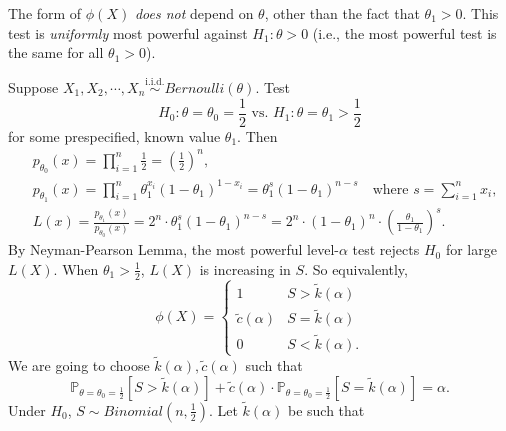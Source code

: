 \documentclass[a4paper]{article}
\begin{document}
\begin{remark}
	The form of $\phi(X)$ \emph{does not} depend on $\theta$, other than the fact that $\theta_1 > 0$. This test is \emph{uniformly} most powerful against $H_1: \theta > 0$ (i.e., the most powerful test is the same for all $\theta_1 > 0$).
\end{remark}

\begin{eg}
	Suppose $X_1,X_2,\cdots,X_n \stackrel{\text{i.i.d.}}{\sim} Bernoulli(\theta)$. Test
	\begin{equation*}
		H_0: \theta = \theta_0 = \frac{1}{2} \text{ vs. } H_1: \theta = \theta_1 > \frac{1}{2}
	\end{equation*}
	for some prespecified, known value $\theta_1$. Then
	\begin{equation*}
		\begin{aligned}
			& p_{\theta_0}(x) = \prod\limits_{i=1}^n \frac{1}{2} = (\frac{1}{2})^n, \\
			& p_{\theta_1}(x) = \prod\limits_{i=1}^n \theta_1^{x_i}(1-\theta_1)^{1-x_i} = \theta_1^s(1-\theta_1)^{n-s} \quad \text{where } s =\sum\limits_{i=1}^n x_i, \\
			& L(x) = \frac{p_{\theta_1}(x)}{p_{\theta_0}(x)} = 2^n \cdot \theta_1^s (1-\theta_1)^{n-s} = 2^n \cdot (1-\theta_1)^n \cdot \left(\frac{\theta_1}{1-\theta_1}\right)^s.
		\end{aligned}
	\end{equation*}
	By Neyman-Pearson Lemma, the most powerful level-$\alpha$ test rejects $H_0$ for large $L(X)$.
	When $\theta_1 > \frac{1}{2}$, $L(X)$ is increasing in $S$. So equivalently,
	\begin{equation*}
		\phi(X) = \left\{
		\begin{array}{ll}
			1 & S > \tilde{k}(\alpha) \\
			\tilde{c}(\alpha) & S = \tilde{k}(\alpha) \\
			0 & S < \tilde{k}(\alpha).
		\end{array}
		\right.	
	\end{equation*}
	We are going to choose $\tilde{k}(\alpha), \tilde{c}(\alpha)$ such that
	\begin{equation*}
		\mathbb{P}_{\theta = \theta_0 = \frac{1}{2}}[S > \tilde{k}(\alpha)] + \tilde{c}(\alpha) \cdot \mathbb{P}_{\theta = \theta_0 = \frac{1}{2}}[S = \tilde{k}(\alpha)] = \alpha.
	\end{equation*}
	Under $H_0$, $S \sim Binomial(n,\frac{1}{2})$. Let $\tilde{k}(\alpha)$ be such that 
	\begin{equation*}

\end{equation*}
\end{eg}
\end{document}
